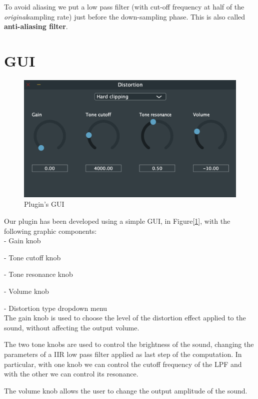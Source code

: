 \documentclass[letterpaper, 12pt]{article}
\begin{document}
	To avoid aliasing we put a low pass filter (with cut-off frequency at half of the \textsl{original}sampling rate) just before the down-sampling phase. This is also called \textbf{anti-aliasing filter}.

	
	\section{GUI}
	
	\begin{figure}[h!]
		\includegraphics[scale=0.7]{gui.png}
		\centering
		\caption{Plugin's GUI}
		\label{fig:gui}
	\end{figure}

	Our plugin has been developed using a simple GUI, in Figure[\ref{fig:gui}], with the following graphic components:
	\\
	
	
	-	Gain knob 
	
	-	Tone cutoff knob 
	
	-	Tone resonance knob
	
	-	Volume knob
	
	-	Distortion type dropdown menu
	\\
	
	
	The gain knob is used to choose the level of the distortion effect applied to the sound, without affecting the output volume.
	
	The two tone knobs are used to control the brightness of the sound, changing the parameters of a IIR low pass filter applied as last step of the computation. In particular, with one knob we can control the cutoff frequency of the LPF and with the other we can control its resonance. 
	
	The volume knob allows the user to change the output amplitude of the sound.
	
\end{document}
